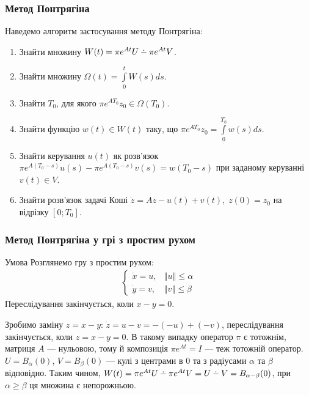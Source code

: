 \documentclass[10pt,pdf]{beamer}
\renewcommand{\d}[1]{\dot{#1}}
\newcommand{\norm}[1]{\left\Vert #1 \right\Vert}
\newcommand{\intl}{\int\limits}
\def\setdif{\mathbin{\ooalign{\hss\raise1ex\hbox{.}\hss\cr
  \mathsurround=0pt$-$}}}
\begin{document}
    \begin{frame}
        \frametitle{Метод Понтрягіна}
    
        Наведемо алгоритм застосування методу Понтрягіна:
    
        \begin{enumerate}
            \item Знайти множину $W(t) = \pi e^{At}U \setdif \pi e^{At}V$.
            \item Знайти множину $\Omega(t) = \intl_0^t W(s)ds$.
            \item Знайти $T_0$, для якого $\pi e^{A T_0} z_0 \in \Omega(T_0)$.
            \item Знайти функцію $w(t) \in W(t)$ таку, що $\pi e^{A T_0} z_0 = \intl_0^{T_0} w(s) ds$.
            \item Знайти керування $u(t)$ як розв'язок $\pi e^{A (T_0-s)} u(s) - \pi e^{A (T_0-s)} v(s) = w(T_0 - s) $ при заданому керуванні $v(t) \in V$.
            \item Знайти розв'язок задачі Коші $\d{z} = Az - u(t) + v(t), \; z(0) = z_0$ на відрізку $[0; T_0]$.
        \end{enumerate}
    \end{frame}
    \begin{frame}
        \frametitle{Метод Понтрягіна у грі з простим рухом}
        \begin{block}{Умова}
            Розглянемо гру з простим рухом:
            \begin{gather*}
                \begin{cases}
                    \d{x} = u, & \norm{u} \leq \alpha \\
                    \d{y} = v, & \norm{v} \leq \beta 
                \end{cases}
            \end{gather*}
            Переслідування закінчується, коли $x - y = 0$.
        \end{block}
        Зробимо заміну $z = x - y$: $\d{z} = u - v = -(-u) + (-v)$,
        переслідування закінчується, коли $z = x - y = 0$.
        В такому випадку оператор $\pi$ є тотожнім, матриця $A$ --- нульовою,
        тому й композиція $\pi e^{At} = I$ --- теж тотожній оператор.
        $U = B_{\alpha}(0)$, $V = B_{\beta}(0)$ --- кулі з центрами в $0$ та з радіусами
        $\alpha$ та $\beta$ відповідно. Таким чином, $W(t) = 
        \pi e^{At} U \setdif \pi e^{A t} V = U \setdif V = B_{\alpha - \beta}(0)$,
        при $\alpha \geq \beta$ ця множина є непорожньою.
    \end{frame}
\end{document}
